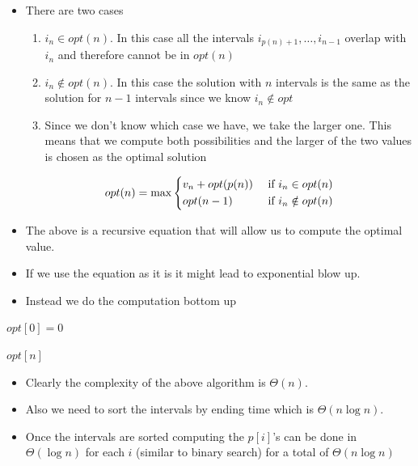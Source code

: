 \documentclass{beamer}
\begin{document}
\begin{frame}
\begin{itemize}
\item There are two cases
  \begin{enumerate}
  \item $i_n\in opt(n)$. In this case all the intervals $i_{p(n)+1},\ldots,i_{n-1}$ overlap with $i_n$ and therefore cannot be in $opt(n)$
  \item $i_n\notin opt(n)$. In this case the solution with $n$ intervals is the same as the solution for $n-1$ intervals since we know $i_n\notin opt$
  \item Since we don't know which case we have, we take the larger one. This means that we compute both possibilities and the larger of the two values is chosen as the optimal solution
  \end{enumerate}

  \begin{align*}
    opt(n)=\max\begin{dcases} v_n+opt(p(n)) &\text{ if }i_n\in opt(n)\\ opt(n-1) &\text{ if } i_n\notin opt(n)\end{dcases}
  \end{align*}
\item The above is a recursive equation that will allow us to compute the optimal value.
\item If we use the equation as it is it might lead to exponential blow up.
\item Instead we do the computation bottom up
  \end{itemize}
\end{frame}

\begin{frame}
  \begin{algorithm}[H]
 
  \DontPrintSemicolon
  \BlankLine

$opt[0]=0$\;

\Return $opt[n]$\;  
\end{algorithm}
\begin{itemize}
\item Clearly the complexity of the above algorithm is $\Theta(n)$.
\item Also we need to sort the intervals by ending time which is $\Theta(n\log n)$.
\item Once the intervals are sorted computing the $p[i]$'s can be done in $\Theta(\log n)$ for each $i$ (similar to binary search) for a total of $\Theta(n\log n)$
\end{itemize}
\end{frame}
\end{document}
